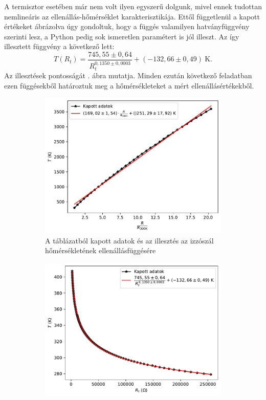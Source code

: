 \documentclass[a4paper, 12pt]{article}
\begin{document}
    A termisztor esetében már nem volt ilyen egyszerű dolgunk, mivel ennek tudottan nemlineáris az ellenállás-hőmérséklet karakterisztikája.
    Ettől függetlenül a kapott értékeket ábrázolva úgy gondoltuk, hogy a függés valamilyen hatványfüggvény szerinti lesz, a Python pedig sok ismeretlen paramétert is jól illeszt.
    Az így illesztett függvény a következő lett:
    \begin{equation}
        T(R_t)=\dfrac{745,55\pm 0,64}{R_t^{0,1350\pm 0,0003}}+(-132,66\pm 0,49)~\mathrm{K}.
    \end{equation}
    Az illesztések pontosságát . ábra mutatja.
    Minden ezután következő feladatban ezen függésekből határoztuk meg a hőmérsékleteket a mért ellenállásértékekből.
    \begin{figure}[H]
        \centering
        \begin{subfigure}[b]{0.49\textwidth}
            \centering
            \includegraphics[width=\textwidth]{1linilleszt}
            \caption{A táblázatból kapott adatok és az illesztés az izzószál hőmérsékletének ellenállásfüggésére}
            \label{fig:1izzo}
        \end{subfigure}
        \begin{subfigure}[b]{0.49\textwidth}
            \centering
            \includegraphics[width=\textwidth]{1vmiilleszt}

\end{subfigure}
\end{figure}
\end{document}
